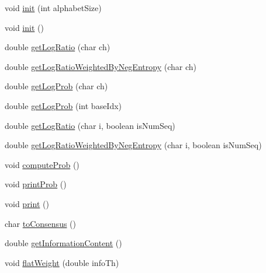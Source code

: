\begin{DoxyCompactItemize}
\item 
void \hyperlink{classbroad_1_1core_1_1motif_1_1_position_weight_column_ae153a2a5518ba867a38f580bf936187a}{init} (int alphabet\+Size)
\item 
void \hyperlink{classbroad_1_1core_1_1motif_1_1_position_weight_column_af48227030027d230fa1bb09409a9c3e0}{init} ()
\item 
double \hyperlink{classbroad_1_1core_1_1motif_1_1_position_weight_column_acc95c9927ec2eb0099868cd6cf56acfd}{get\+Log\+Ratio} (char ch)
\item 
double \hyperlink{classbroad_1_1core_1_1motif_1_1_position_weight_column_a585fabfe6c110fee519aa51ceda7fd81}{get\+Log\+Ratio\+Weighted\+By\+Neg\+Entropy} (char ch)
\item 
double \hyperlink{classbroad_1_1core_1_1motif_1_1_position_weight_column_af17d5c4039831262d7716ce3c80c77cc}{get\+Log\+Prob} (char ch)
\item 
double \hyperlink{classbroad_1_1core_1_1motif_1_1_position_weight_column_aa5bf75a68363f237582b362d3f44e648}{get\+Log\+Prob} (int base\+Idx)
\item 
double \hyperlink{classbroad_1_1core_1_1motif_1_1_position_weight_column_aa1c34e4df6a34f13e3ed272f1eaffebc}{get\+Log\+Ratio} (char i, boolean is\+Num\+Seq)
\item 
double \hyperlink{classbroad_1_1core_1_1motif_1_1_position_weight_column_a219912bf0dca3ef55520d40cf2e30898}{get\+Log\+Ratio\+Weighted\+By\+Neg\+Entropy} (char i, boolean is\+Num\+Seq)
\item 
void \hyperlink{classbroad_1_1core_1_1motif_1_1_position_weight_column_a43ec5b48d9467a142242c9e3c4e4863e}{compute\+Prob} ()
\item 
void \hyperlink{classbroad_1_1core_1_1motif_1_1_position_weight_column_a1ca0b6c53be56651b221416797055320}{print\+Prob} ()
\item 
void \hyperlink{classbroad_1_1core_1_1motif_1_1_position_weight_column_a0dd23bc82d78d538874827c25cec10e3}{print} ()
\item 
char \hyperlink{classbroad_1_1core_1_1motif_1_1_position_weight_column_a66a4df9e60746c26f9b04962364ef26f}{to\+Consensus} ()
\item 
double \hyperlink{classbroad_1_1core_1_1motif_1_1_position_weight_column_ac3d42c98e9344071ac290237548d7337}{get\+Information\+Content} ()
\item 
void \hyperlink{classbroad_1_1core_1_1motif_1_1_position_weight_column_a1900813fbbbfb3b2b4a80fb1a168698c}{flat\+Weight} (double info\+Th)
\item 

\end{DoxyCompactItemize}
